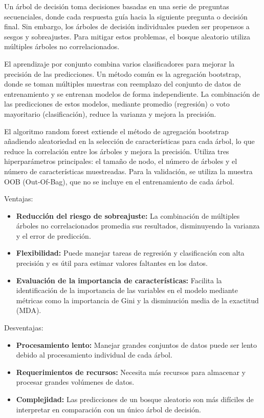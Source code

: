 Un árbol de decisión toma decisiones basadas en una serie de preguntas secuenciales, donde cada respuesta guía hacia la siguiente pregunta o decisión final. Sin embargo, los árboles de decisión individuales pueden ser propensos a sesgos y sobreajustes. Para mitigar estos problemas, el bosque aleatorio utiliza múltiples árboles no correlacionados.

El aprendizaje por conjunto combina varios clasificadores para mejorar la precisión de las predicciones. Un método común es la agregación bootstrap, donde se toman múltiples muestras con reemplazo del conjunto de datos de entrenamiento y se entrenan modelos de forma independiente. La combinación de las predicciones de estos modelos, mediante promedio (regresión) o voto mayoritario (clasificación), reduce la varianza y mejora la precisión.

El algoritmo random forest extiende el método de agregación bootstrap añadiendo aleatoriedad en la selección de características para cada árbol, lo que reduce la correlación entre los árboles y mejora la precisión. Utiliza tres hiperparámetros principales: el tamaño de nodo, el número de árboles y el número de características muestreadas. Para la validación, se utiliza la muestra OOB (Out-Of-Bag), que no se incluye en el entrenamiento de cada árbol.


\hfill

Ventajas:
\begin{itemize}
\tightlist
    \item
        \textbf{Reducción del riesgo de sobreajuste:} La combinación de múltiples árboles no correlacionados promedia sus resultados, disminuyendo la varianza y el error de predicción.
    \item 
        \textbf{Flexibilidad:} Puede manejar tareas de regresión y clasificación con alta precisión y es útil para estimar valores faltantes en los datos.
    \item 
        \textbf{Evaluación de la importancia de características:} Facilita la identificación de la importancia de las variables en el modelo mediante métricas como la importancia de Gini y la disminución media de la exactitud (MDA).
\end{itemize}

Desventajas:
\begin{itemize}
\tightlist
    \item
        \textbf{Procesamiento lento:} Manejar grandes conjuntos de datos puede ser lento debido al procesamiento individual de cada árbol.
    \item 
        \textbf{Requerimientos de recursos:} Necesita más recursos para almacenar y procesar grandes volúmenes de datos.
    \item 
        \textbf{Complejidad:} Las predicciones de un bosque aleatorio son más difíciles de interpretar en comparación con un único árbol de decisión.
\end{itemize}


